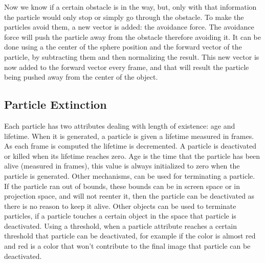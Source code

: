 Now we know if a certain obstacle is in the way, but, only with that information the particle would only stop or simply go through the obstacle. To make the particles avoid them, a new vector is added: the avoidance force. The avoidance force will push the particle away from the obstacle therefore avoiding it. It can be done using a the center of the sphere position and the forward vector of the particle, by subtracting them and then normalizing the result. This new vector is now added to the forward vector every frame, and that will result the particle being pushed away from the center of the object. 
\subsection{Particle Extinction}
Each particle has two attributes dealing with length of existence: age and lifetime. When it is generated, a particle is given a lifetime measured in frames. As each frame is computed the lifetime is decremented. A particle is deactivated or killed when its lifetime reaches zero. Age is the time that the particle has been alive (measured in frames), this value is always initialized to zero when the particle is generated. Other mechanisms, can be used for terminating a particle. If the particle ran out of bounds, these bounds can be in screen space or in projection space, and will not reenter it, then the particle can be deactivated as there is no reason to keep it alive. Other objects can be used to terminate particles, if a particle touches a certain object in the space that particle is deactivated. Using a threshold, when a particle attribute reaches a certain threshold that particle can be deactivated, for example if the color is almost red and red is a color that won't contribute to the final image that particle can be deactivated. 

